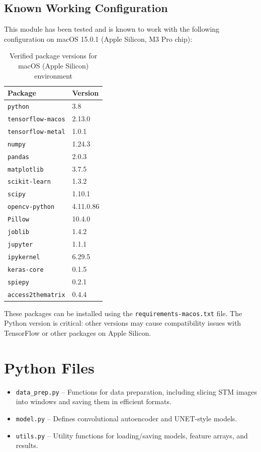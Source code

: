 \documentclass[11pt]{article}
\begin{document}
\subsection*{Known Working Configuration}
This module has been tested and is known to work with the following configuration on macOS 15.0.1 (Apple Silicon, M3 Pro chip):
\begin{table}[H]
\centering
\begin{tabular}{ll}
\hline
\textbf{Package} & \textbf{Version} \\
\hline
\texttt{python} & 3.8 \\
\texttt{tensorflow-macos} & 2.13.0 \\
\texttt{tensorflow-metal} & 1.0.1 \\
\texttt{numpy} & 1.24.3 \\
\texttt{pandas} & 2.0.3 \\
\texttt{matplotlib} & 3.7.5 \\
\texttt{scikit-learn} & 1.3.2 \\
\texttt{scipy} & 1.10.1 \\
\texttt{opencv-python} & 4.11.0.86 \\
\texttt{Pillow} & 10.4.0 \\
\texttt{joblib} & 1.4.2 \\
\texttt{jupyter} & 1.1.1 \\
\texttt{ipykernel} & 6.29.5 \\
\texttt{keras-core} & 0.1.5 \\
\texttt{spiepy} & 0.2.1 \\
\texttt{access2thematrix} & 0.4.4 \\
\hline
\end{tabular}
\caption{Verified package versions for macOS (Apple Silicon) environment}
\end{table}


These packages can be installed using the \texttt{requirements-macos.txt} file. The Python version is critical: other versions may cause compatibility issues with TensorFlow or other packages on Apple Silicon.

\section*{Python Files}
\begin{itemize}
  \item \texttt{data\_prep.py} – Functions for data preparation, including slicing STM images into windows and saving them in efficient formats.
  \item \texttt{model.py} – Defines convolutional autoencoder and UNET-style models.
  \item \texttt{utils.py} – Utility functions for loading/saving models, feature arrays, and results.
\end{itemize}
\end{document}
